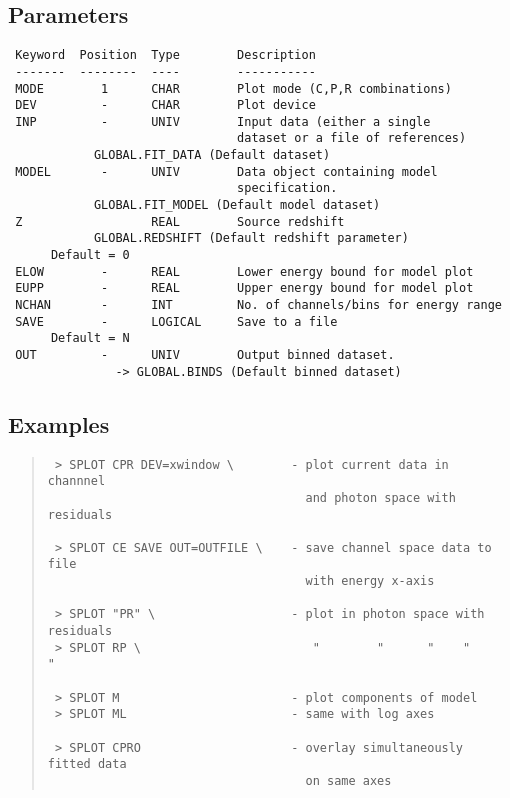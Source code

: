 \documentclass{book}
\renewcommand{\_}{{\tt\char'137}}     %
\begin{document}
\subsection{Parameters}
\begin{verbatim}
 Keyword  Position  Type        Description
 -------  --------  ----        -----------
 MODE        1      CHAR        Plot mode (C,P,R combinations)
 DEV         -      CHAR        Plot device
 INP         -      UNIV        Input data (either a single
                                dataset or a file of references)
            GLOBAL.FIT_DATA (Default dataset)
 MODEL       -      UNIV        Data object containing model
                                specification.
            GLOBAL.FIT_MODEL (Default model dataset)
 Z                  REAL        Source redshift
            GLOBAL.REDSHIFT (Default redshift parameter)
      Default = 0
 ELOW        -      REAL        Lower energy bound for model plot
 EUPP        -      REAL        Upper energy bound for model plot
 NCHAN       -      INT         No. of channels/bins for energy range
 SAVE        -      LOGICAL     Save to a file
      Default = N
 OUT         -      UNIV        Output binned dataset.
               -> GLOBAL.BINDS (Default binned dataset)
\end{verbatim}\subsection{Examples}
\begin{quote}\begin{verbatim}
 > SPLOT CPR DEV=xwindow \        - plot current data in channnel
                                    and photon space with residuals

 > SPLOT CE SAVE OUT=OUTFILE \    - save channel space data to file
                                    with energy x-axis

 > SPLOT "PR" \                   - plot in photon space with residuals
 > SPLOT RP \                        "        "      "    "       "

 > SPLOT M                        - plot components of model
 > SPLOT ML                       - same with log axes

 > SPLOT CPRO                     - overlay simultaneously fitted data
                                    on same axes
\end{verbatim}\end{quote}
\end{document}
